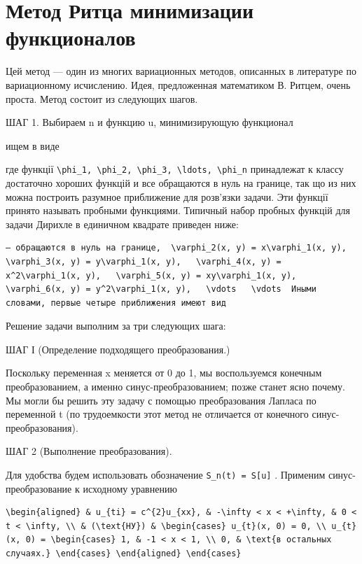 \documentclass[
  ukrainian,
]{article}
\begin{document}
\section{Метод Ритца минимизации
функционалов}\label{ux43cux435ux442ux43eux434-ux440ux438ux442ux446ux430-ux43cux438ux43dux438ux43cux438ux437ux430ux446ux438ux438-ux444ux443ux43dux43aux446ux438ux43eux43dux430ux43bux43eux432}

Цей метод --- один из многих вариационных методов, описанных в
литературе по вариационному исчислению. Идея, предложенная математиком
В. Ритцем, очень проста. Метод состоит из следующих шагов.

ШАГ 1. Выбираем n и функцию u, минимизирующую функционал

ищем в виде

где функції
\texttt{\textbackslash{}phi\_1,\ \textbackslash{}phi\_2,\ \textbackslash{}phi\_3,\ \textbackslash{}ldots,\ \textbackslash{}phi\_n}
принадлежат к классу достаточно хороших функцій и все обращаются в нуль
на границе, так що из них можна построить разумное приближение для
розв'язки задачи. Эти функції принято называть пробными функциями.
Типичный набор пробных функцій для задачи Дирихле в единичном квадрате
приведен ниже:

\begin{verbatim}
— обращаются в нуль на границе,  \varphi_2(x, y) = x\varphi_1(x, y),   \varphi_3(x, y) = y\varphi_1(x, y),   \varphi_4(x, y) = x^2\varphi_1(x, y),   \varphi_5(x, y) = xy\varphi_1(x, y),   \varphi_6(x, y) = y^2\varphi_1(x, y),   \vdots   \vdots  Иными словами, первые четыре приближения имеют вид
\end{verbatim}

Решение задачи выполним за три следующих шага:

ШАГ І (Определение подходящего преобразования.)

Поскольку переменная x меняется от 0 до 1, мы воспользуемся конечным
преобразованием, а именно синус-преобразованием; позже станет ясно
почему. Мы могли бы решить эту задачу с помощью преобразования Лапласа
по переменной t (по трудоемкости этот метод не отличается от конечного
синус-преобразования).

ШАГ 2 (Выполнение преобразования).

Для удобства будем использовать обозначение
\texttt{S\_n(t)\ =\ S{[}u{]}} . Применим синус-преобразование к
исходному уравнению

\begin{verbatim}
\begin{aligned} & u_{ti} = c^{2}u_{xx}, & -\infty < x < +\infty, & 0 < t < \infty, \\ & (\text{НУ}) & \begin{cases} u_{t}(x, 0) = 0, \\ u_{t}(x, 0) = \begin{cases} 1, & -1 < x < 1, \\ 0, & \text{в остальных случаях.} \end{cases} \end{aligned} \end{cases}
\end{verbatim}
\end{document}
